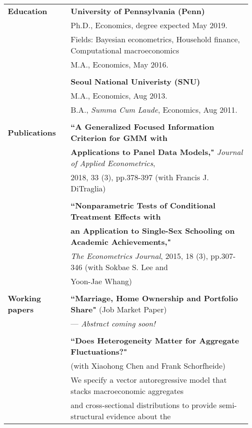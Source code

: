 \documentclass[letterpaper,11pt,oneside]{article}
\begin{document}
\noindent \begin{tabular}{@{} l l}
 \large{\textbf{Education}} 
    & \textbf{University of Pennsylvania (Penn)} \\
     & Ph.D., Economics, degree expected May 2019. \\
     & Fields: Bayesian econometrics, Household finance, Computational macroeconomics \\
     & M.A., Economics, May 2016. \\
     & \\
     & \textbf{Seoul National Univeristy (SNU)} \\
          & M.A., Economics, Aug 2013. \\
     & B.A., \textit{Summa Cum Laude}, Economics, Aug 2011. \\
     \vspace{0.1in} \\
      \large{\textbf{Publications}}    & \textbf{``A Generalized Focused Information Criterion for GMM with } \\
 &\textbf{Applications to Panel Data Models,"}  \textit{Journal of Applied Econometrics},\\
 & 2018, 33 (3), pp.378-397 (with Francis J. DiTraglia) \\
    & \\
 & \textbf{``Nonparametric Tests of Conditional Treatment Effects with}\\
 & \textbf{an Application to Single-Sex Schooling on Academic Achievements,"} \\
 & \textit{The Econometrics Journal}, 2015, 18 (3), pp.307-346 (with Sokbae S. Lee and \\
 & Yoon-Jae Whang) \\ 
  \vspace{0.1in} \\
 \large{\textbf{Working papers}}    & \textbf{``Marriage, Home Ownership and Portfolio Share"} (Job Market Paper)\\
 & --- \textit{Abstract coming soon!}\\[0.1in]
    & \\
  & \textbf{``Does Heterogeneity Matter for Aggregate Fluctuations?"}\\
  & (with Xiaohong Chen and Frank Schorfheide)\\[0.05in] 
  & We specify a vector autoregressive model that stacks macroeconomic aggregates\\
 & and cross-sectional distributions to provide semi-structural evidence about the \\

\end{tabular}
\end{document}
